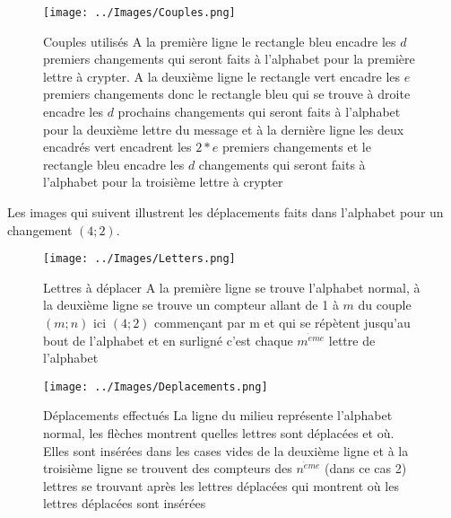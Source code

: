 \documentclass[a4paper,12pt]{report}
\begin{document}
     \begin{figure}[h!]
     \begin{center}
     \texttt{[image: ../Images/Couples.png]}  
     \end{center}
     \caption{Couples utilisés \newline
     A la première ligne le rectangle bleu encadre les $d$ premiers changements qui seront faits à l'alphabet pour la première lettre à crypter. A la deuxième ligne le rectangle vert encadre les $e$ premiers changements donc le rectangle bleu qui se trouve à droite encadre les $d$ prochains changements qui seront faits à l'alphabet pour la deuxième lettre du message et à la dernière ligne les deux encadrés vert encadrent les $2*e$ premiers changements et le rectangle bleu encadre les $d$ changements qui seront faits à l'alphabet pour la troisième lettre à crypter}
     \end{figure}  
     \newline
     Les images qui suivent illustrent les déplacements faits dans l'alphabet pour un changement $(4;2)$.
     \begin{figure}[h!]
     \begin{center}
     \texttt{[image: ../Images/Letters.png]} 
     \end{center}
     \caption{Lettres à déplacer \newline
     A la première ligne se trouve l'alphabet normal, à la deuxième ligne se trouve un compteur allant de 1 à $m$ du couple $(m;n)$ ici $(4;2)$ commençant par m et qui se répètent jusqu'au bout de l'alphabet et en surligné c'est chaque $m^{\grave{e}me}$ lettre de l'alphabet}
     \end{figure}
     \newline
     \begin{figure}[h!]
     \begin{center}
      \texttt{[image: ../Images/Deplacements.png]} 
     \end{center}
     \caption{Déplacements effectués \newline
     La ligne du milieu représente l'alphabet normal, les flèches montrent quelles lettres sont déplacées et où. Elles sont insérées dans les cases vides de la deuxième ligne et à la troisième ligne se trouvent des compteurs des $n^{\grave{e}me}$ (dans ce cas 2) lettres se trouvant après les lettres déplacées qui montrent où les lettres déplacées sont insérées}
     \end{figure}
     \newline
\end{document}
